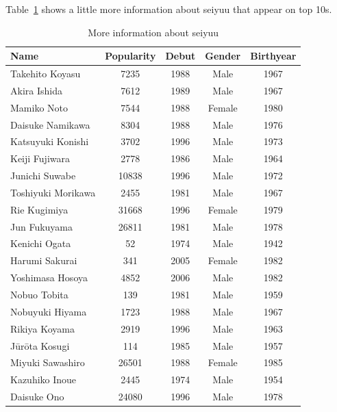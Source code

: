 Table~\ref{tab:moreInfoSeiyuu} shows a little more information about seiyuu that appear on top 10s.
\begin{table}[!hbt]
	\begin{center}
	\caption{More information about seiyuu}
	\label{tab:moreInfoSeiyuu}
	\begin{tabular}{|l|c|c|c|c|}
		\hline
		Name & Popularity & Debut & Gender & Birthyear \\
		\hline
		Takehito Koyasu & 7235 & 1988 & Male & 1967 \\
		\hline
		Akira Ishida & 7612 & 1989 & Male & 1967 \\
		\hline
		Mamiko Noto & 7544 & 1988 & Female & 1980 \\
		\hline
		Daisuke Namikawa & 8304 & 1988 & Male & 1976 \\
		\hline
		Katsuyuki Konishi & 3702 & 1996 & Male & 1973 \\
		\hline
		Keiji Fujiwara & 2778 & 1986 & Male & 1964 \\
		\hline
		Junichi Suwabe & 10838 & 1996 & Male & 1972 \\
		\hline
		Toshiyuki Morikawa & 2455 & 1981 & Male & 1967 \\
		\hline
		Rie Kugimiya & 31668 & 1996 & Female & 1979 \\
		\hline
		Jun Fukuyama & 26811 & 1981 & Male & 1978 \\
		\hline
		Kenichi Ogata & 52 & 1974 & Male & 1942 \\
		\hline
		Harumi Sakurai & 341 & 2005 & Female & 1982 \\
		\hline
		Yoshimasa Hosoya & 4852 & 2006 & Male & 1982 \\
		\hline
		Nobuo Tobita & 139 & 1981 & Male & 1959 \\
		\hline
		Nobuyuki Hiyama & 1723 & 1988 & Male & 1967 \\
		\hline
		Rikiya Koyama & 2919 & 1996 & Male & 1963 \\
		\hline
		Jūrōta Kosugi & 114 & 1985 & Male & 1957 \\
		\hline
		Miyuki Sawashiro & 26501 & 1988 & Female & 1985 \\
		\hline
		Kazuhiko Inoue & 2445 & 1974 & Male & 1954 \\
		\hline
		Daisuke Ono & 24080 & 1996 & Male & 1978 \\
		\hline
	\end{tabular}
	\end{center}
\end{table}
